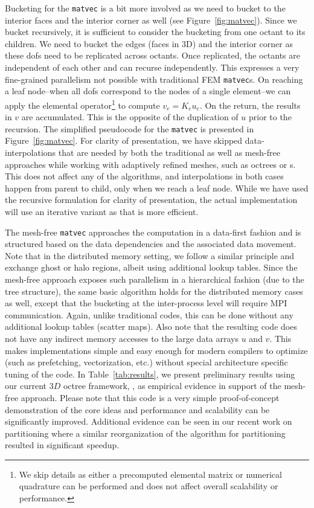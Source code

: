 Bucketing for the \texttt{matvec} is a bit more involved as we need to bucket to the interior faces and the interior corner as well (see Figure~\ref{fig:matvec}). Since we bucket recursively, it is sufficient to consider the bucketing from one octant to its children. We need to bucket the edges (faces in 3D) and the interior corner as these dofs need to be replicated across octants. Once replicated, the octants are independent of each other and can recurse independently. This expresses a very fine-grained parallelism not possible with traditional FEM \texttt{matvec}s. On reaching a leaf node--when all dofs correspond to the nodes of a single element--we can apply the elemental operator\footnote{We skip details as either a precomputed elemental matrix or numerical quadrature can be performed and does not affect overall scalability or performance.} to compute $v_e = K_e u_e$. On the return, the results in $v$ are accumulated. This is the opposite of the duplication of $u$ prior to the recursion. The simplified pseudocode for the \texttt{matvec} is presented in Figure~\ref{fig:matvec}. For clarity of presentation, we have skipped data-interpolations that are needed by both the traditional as well as mesh-free approaches while working with adaptively refined meshes, such as octrees or \stri s. This does not affect any of the algorithms, and interpolations in both cases happen from parent to child, only when we reach a leaf node. While we have used the recursive formulation for clarity of presentation, the actual implementation will use an iterative variant as that is more efficient. 

The mesh-free \texttt{matvec} approaches the computation in a data-first fashion and is structured based on the data dependencies and the associated data movement. Note that in the distributed memory setting, we follow a similar principle and exchange ghost or halo regions, albeit using additional lookup tables. Since the mesh-free approach exposes such parallelism in a hierarchical fashion (due to the tree structure), the same basic algorithm holds for the distributed memory cases as well, except that the bucketing at the inter-process level will require {\textsc MPI} communication. Again, unlike traditional codes, this can be done without any additional lookup tables (scatter maps). Also note that the resulting code does not have any indirect memory accesses to the large data arrays $u$ and $v$. This makes implementations simple and easy enough for modern compilers to optimize (such as prefetching, vectorization, etc.) without special architecture specific tuning of the code. In Table~\ref{tab:results}, we present preliminary results using our current $3D$ octree framework, \dendro, as empirical evidence in support of the mesh-free approach. Please note that this code is a very simple proof-of-concept demonstration of the core ideas and performance and scalability can be significantly improved.  Additional evidence can be seen in our recent work on partitioning \cite{FernandoDuplyakinSundar17} where a similar reorganization of the algorithm for partitioning resulted in significant speedup.   

